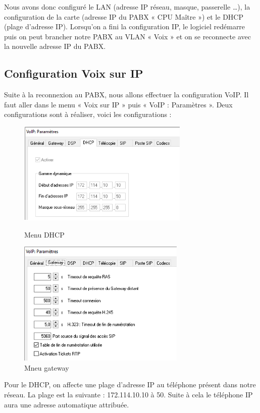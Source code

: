 \documentclass[12pt, a4paper]{article}
\begin{document}
	Nous avons donc configuré le LAN (adresse IP réseau, masque, passerelle …), 
	la configuration de la carte (adresse IP du PABX « CPU Maître ») et le DHCP 
	(plage d’adresse IP). Lorsqu’on a fini la configuration IP, le logiciel redémarre 
	puis on peut brancher notre PABX au VLAN « Voix » et on se reconnecte avec la 
	nouvelle adresse IP du PABX.

	\subsection{Configuration Voix sur IP}

	Suite à la reconnexion au PABX, nous allons effectuer la configuration VoIP. 
	Il faut aller dans le menu « Voix sur IP » puis « VoIP : Paramètres ». Deux 
	configurations sont à réaliser, voici les configurations :

	\begin{figure}[h]
		\begin{minipage}[c]{.46\linewidth}
			\centering
			\includegraphics{img/menudh.png}
			\caption{Menu DHCP}
		\end{minipage}
		\hfill%
		\begin{minipage}[c]{.46\linewidth}
			\centering
			\includegraphics{img/gate.png}
			\caption{Mneu gateway}
		\end{minipage}
	\end{figure}

	Pour le DHCP, on affecte une plage d’adresse IP au téléphone présent dans notre réseau.
	La plage est la suivante : 172.114.10.10 à 50. Suite à cela le téléphone IP aura une 
	adresse automatique attribuée.
	
\end{document}
